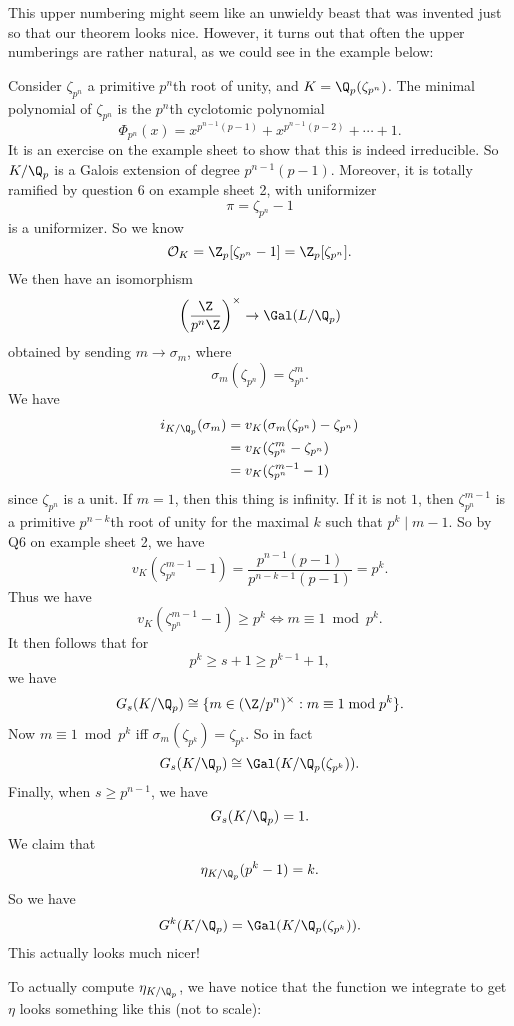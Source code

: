 \documentclass[a4paper]{article}
\begin{document}
This upper numbering might seem like an unwieldy beast that was invented just so that our theorem looks nice. However, it turns out that often the upper numberings are rather natural, as we could see in the example below:
\begin{eg}
  Consider $\zeta_{p^n}$ a primitive $p^n$th root of unity, and $K = \Q_p(\zeta_{p^n})$. The minimal polynomial of $\zeta_{p^n}$ is the $p^n$th cyclotomic polynomial
  \[
    \Phi_{p^n}(x) = x^{p^{n - 1}(p - 1)} + x^{p^{n - 1}(p - 2)} + \cdots + 1.
  \]
  It is an exercise on the example sheet to show that this is indeed irreducible. So $K/\Q_p$ is a Galois extension of degree $p^{n - 1}(p - 1)$. Moreover, it is totally ramified by question 6 on example sheet 2, with uniformizer
  \[
    \pi = \zeta_{p^n} - 1
  \]
  is a uniformizer. So we know
  \[
    \mathcal{O}_K = \Z_p[\zeta_{p^n} - 1] = \Z_p[\zeta_{p^n}].
  \]
  We then have an isomorphism
  \[
    \left(\frac{\Z}{p^n \Z}\right)^\times \to \Gal(L/\Q_p)
  \]
  obtained by sending $m \to \sigma_m$, where
  \[
    \sigma_m(\zeta_{p^n}) = \zeta_{p^n}^m.
  \]
  We have
  \begin{align*}
    i_{K/\Q_p}(\sigma_m) &= v_K(\sigma_m (\zeta_{p^n}) - \zeta_{p^n})\\
    &= v_K(\zeta_{p^n}^m - \zeta_{p^n})\\
    &= v_K(\zeta_{p^n}^{m - 1} - 1)
  \end{align*}
  since $\zeta_{p^n}$ is a unit. If $m = 1$, then this thing is infinity. If it is not $1$, then $\zeta_{p^n}^{m - 1}$ is a primitive $p^{n - k}$th root of unity for the maximal $k$ such that $p^k \mid m- 1$. So by Q6 on example sheet 2, we have
  \[
    v_K(\zeta_{p^n}^{m - 1} - 1) = \frac{p^{n - 1}(p - 1)}{p^{n - k - 1}(p - 1)} = p^k.
  \]
  Thus we have
  \[
    v_K(\zeta_{p^n}^{m - 1} - 1) \geq p^k \Leftrightarrow m \equiv 1\bmod {p^k}.
  \]
  It then follows that for
  \[
    p^k \geq s + 1 \geq p^{k - 1} + 1,
  \]
  we have
  \[
    G_s(K/\Q_p) \cong \{m \in (\Z/p^n)^\times: m \equiv 1 \bmod p^k\}.
  \]
  Now $m \equiv 1 \bmod p^k$ iff $\sigma_m(\zeta_{p^k}) = \zeta_{p^k}$. So in fact
  \[
    G_s(K/\Q_p) \cong \Gal(K/\Q_p(\zeta_{p^k})).
  \]
  Finally, when $s \geq p^{n - 1}$, we have
  \[
    G_s(K/\Q_p) = 1.
  \]
  We claim that
  \[
    \eta_{K/\Q_p}(p^k - 1) = k.
  \]
  So we have
  \[
    G^k(K/\Q_p) = \Gal(K/\Q_p(\zeta_{p^k})).
  \]
  This actually looks much nicer!

  To actually compute $\eta_{K/\Q_p}$, we have notice that the function we integrate to get $\eta$ looks something like this (not to scale):
  \begin{center}
\end{center}
\end{eg}
\end{document}
